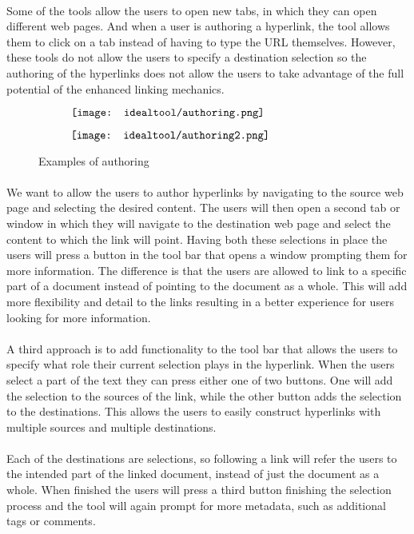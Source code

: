 \paragraph{}
Some of the tools allow the users to open new tabs, in which they can open different web pages. And when a user is authoring a hyperlink, the tool allows them to click on a tab instead of having to type the URL themselves. However, these tools do not allow the users to specify a destination selection so the authoring of the hyperlinks does not allow the users to take advantage of the full potential of the enhanced linking mechanics.
\begin{figure}[h]
	\centering
	\begin{subfigure}[b]{/5}
		\centering
		$\vcenter{\hbox{\texttt{[image: idealtool/authoring.png]}}}$
	\end{subfigure}
	\begin{subfigure}[b]{/5}
		\centering
		$\vcenter{\hbox{\texttt{[image: idealtool/authoring2.png]}}}$
	\end{subfigure}
	\caption{Examples of authoring}
\end{figure}
\paragraph{}
We want to allow the users to author hyperlinks by navigating to the source web page and selecting the desired content. The users will then open a second tab or window in which they will navigate to the destination web page and select the content to which the link will point. Having both these selections in place the users will press a button in the tool bar that opens a window prompting them for more information. The difference is that the users are allowed to link to a specific part of a document instead of pointing to the document as a whole. This will add more flexibility and detail to the links resulting in a better experience for users looking for more information.
\paragraph{}
A third approach is to add functionality to the tool bar that allows the users to specify what role their current selection plays in the hyperlink. When the users select a part of the text they can press either one of two buttons. One will add the selection to the sources of the link, while the other button adds the selection to the destinations. This allows the users to easily construct hyperlinks with multiple sources and multiple destinations.
\paragraph{}
Each of the destinations are selections, so following a link will refer the users to the intended part of the linked document, instead of just the document as a whole. When finished the users will press a third button finishing the selection process and the tool will again prompt for more metadata, such as additional tags or comments.
